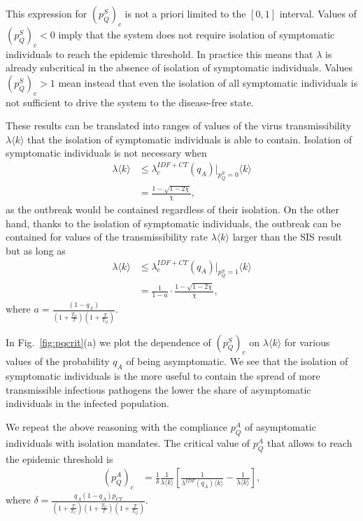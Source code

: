 \documentclass[aps,twocolumn,superscriptaddress,nofootinbib,pre,floatfix]{revtex4-1}
\begin{document}
This expression for $(p_Q^S)_c$ is not a priori limited
to the $[0, 1]$ interval. Values of $(p_Q^S)_c < 0$ imply that the
system does not require isolation of symptomatic individuals to reach
the epidemic threshold. In practice this means that $\lambda$ is already subcritical in the absence of isolation of symptomatic individuals.
Values $(p_Q^S)_c > 1$ mean instead that even the
isolation of all symptomatic individuals is not sufficient to drive the
system to the disease-free state.

These results can be translated into ranges of values of the
virus transmissibility $\lambda \langle k \rangle$ that the
isolation of symptomatic individuals is able to contain.  Isolation of
symptomatic individuals is not necessary when
\begin{align}
  \lambda \langle k \rangle &\leq \lambda_c^{IDF+CT}(q_A)|_{p_Q^S=0} \langle k \rangle\\
    &= \frac{1- \sqrt{1- 2 \chi}}{\chi},
\end{align}
as the outbreak would be contained regardless of their isolation.  On
the other hand, thanks to the isolation of symptomatic individuals,
the outbreak can be contained for values of the transmissibility rate
$\lambda \langle k \rangle$ larger than the SIS result but as long as
\begin{align}
    \lambda \langle k \rangle &\leq \lambda_c^{IDF+CT}(q_A)|_{p_Q^S=1} \langle k \rangle\\
    &= \frac{1}{1-a} \cdot \frac{1- \sqrt{1- 2 \chi}}{\chi},
\end{align}
where $a = \frac{(1-q_A)}{(1+\frac{T_U}{T})(1 + \frac{T}{T_Q})}$.


In Fig.~\ref{fig:pqcrit}(a) we plot the dependence of $(p_Q^S)_c$ on
$\lambda \langle k \rangle$ for various values of the probability
$q_A$ of being asymptomatic. We see that the isolation of symptomatic
individuals is the more useful to contain the spread of more
transmissible infectious pathogens the lower the share of
asymptomatic individuals in the infected population.

We repeat the above reasoning with the compliance $p_Q^A$ of
asymptomatic individuals with isolation mandates.  The critical value
of $p_Q^A$ that allows to reach the epidemic threshold is
\begin{align}
        (p_Q^A)_c &= \frac{1}{\delta}\frac{1}{\lambda \langle k
    \rangle} \left[ \frac{1}{\lambda^{IDF}(q_A) \langle k \rangle} -
    \frac{1}{\lambda \langle k \rangle} \right],
\end{align}
where
$\delta = \frac{q_A(1-q_A) p_{CT}}{(1+\frac{T}{T_U})(1+\frac{T_U}{T})(1+\frac{T}{T_Q})}$.
\end{document}
